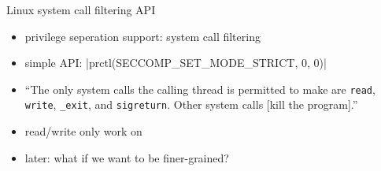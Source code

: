 \begin{frame}{Linux system call filtering API}
    \begin{itemize}
    \item privilege seperation support: system call filtering
    \item simple API: \Cinline|prctl(SECCOMP_SET_MODE_STRICT, 0, 0)|
        \vspace{.5cm}
            \item ``The only system calls the calling thread is permitted to make are \texttt{read},
                \texttt{write}, \texttt{\_exit}, and \texttt{sigreturn}. Other system calls [kill
                the program].''
            \item read/write only work on 
    \vspace{.5cm}
    \item later: what if we want to be finer-grained?
    \end{itemize}
\end{frame}
